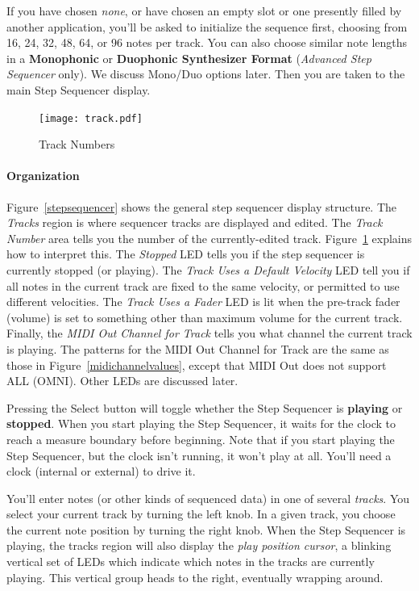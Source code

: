 \documentclass{article}
\begin{document}
If you have chosen {\it none}, or have chosen an empty slot or one presently filled by another application, you'll be asked to initialize the sequence first, choosing from 16, 24, 32, 48, 64, or 96 notes per track. You can also choose similar note lengths in a {\bf Monophonic} or {\bf Duophonic Synthesizer Format} ({\it Advanced Step Sequencer} only).  We discuss Mono/Duo options later. Then you are taken to the main Step Sequencer display.  

\begin{figure}
\texttt{[image: track.pdf]}
\vspace{-2em}\caption{\small Track Numbers}
\label{tracknumber}
\end{figure}

\paragraph{Organization} Figure~\ref{stepsequencer} shows the general step sequencer display structure.  The {\it Tracks} region is where sequencer tracks are displayed and edited.  The {\it Track Number} area tells you the number of the currently-edited track.  Figure~\ref{tracknumber} explains how to interpret this.  The {\it Stopped} LED tells you if the step sequencer is currently stopped (or playing).  The {\it Track Uses a Default Velocity} LED tell you if all notes in the current track are fixed to the same velocity, or permitted to use different velocities.  The {\it Track Uses a Fader} LED is lit when the pre-track fader (volume) is set to something other than maximum volume for the current track.   Finally, the {\it MIDI Out Channel for Track} tells you what channel the current track is playing.  The patterns for the MIDI Out Channel for Track are the same as those in Figure~\ref{midichannelvalues}, except that MIDI Out does not support ALL (OMNI).  Other LEDs are discussed later.

Pressing the Select button will toggle whether the Step Sequencer is {\bf playing} or {\bf stopped}.  When you start playing the Step Sequencer, it waits for the clock to reach a measure boundary before beginning.  Note that if you start playing the Step Sequencer, but the clock isn't running, it won't play at all.  You'll need a clock (internal or external) to drive it.

You'll enter notes (or other kinds of sequenced data) in one of several {\it tracks}. You select your current track by turning the left knob.  In a given track, you choose the current note position by turning the right knob.  When the Step Sequencer is playing, the  tracks region will also display the {\it play position cursor}, a blinking vertical set of LEDs which indicate which notes in the tracks are currently playing.  This vertical group heads to the right, eventually wrapping around. 
\end{document}
